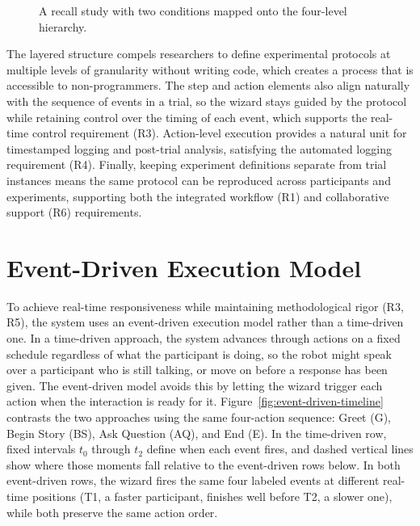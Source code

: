 \begin{figure}[htbp]
\caption{A recall study with two conditions mapped onto the four-level hierarchy.}
\label{fig:example-hierarchy}
\end{figure}

The layered structure compels researchers to define experimental protocols at multiple levels of granularity without writing code, which creates a process that is accessible to non-programmers. The step and action elements also align naturally with the sequence of events in a trial, so the wizard stays guided by the protocol while retaining control over the timing of each event, which supports the real-time control requirement (R3). Action-level execution provides a natural unit for timestamped logging and post-trial analysis, satisfying the automated logging requirement (R4). Finally, keeping experiment definitions separate from trial instances means the same protocol can be reproduced across participants and experiments, supporting both the integrated workflow (R1) and collaborative support (R6) requirements.

\section{Event-Driven Execution Model}

To achieve real-time responsiveness while maintaining methodological rigor (R3, R5), the system uses an event-driven execution model rather than a time-driven one. In a time-driven approach, the system advances through actions on a fixed schedule regardless of what the participant is doing, so the robot might speak over a participant who is still talking, or move on before a response has been given. The event-driven model avoids this by letting the wizard trigger each action when the interaction is ready for it. Figure~\ref{fig:event-driven-timeline} contrasts the two approaches using the same four-action sequence: Greet (G), Begin Story (BS), Ask Question (AQ), and End (E). In the time-driven row, fixed intervals $t_0$ through $t_2$ define when each event fires, and dashed vertical lines show where those moments fall relative to the event-driven rows below. In both event-driven rows, the wizard fires the same four labeled events at different real-time positions (T1, a faster participant, finishes well before T2, a slower one), while both preserve the same action order.

